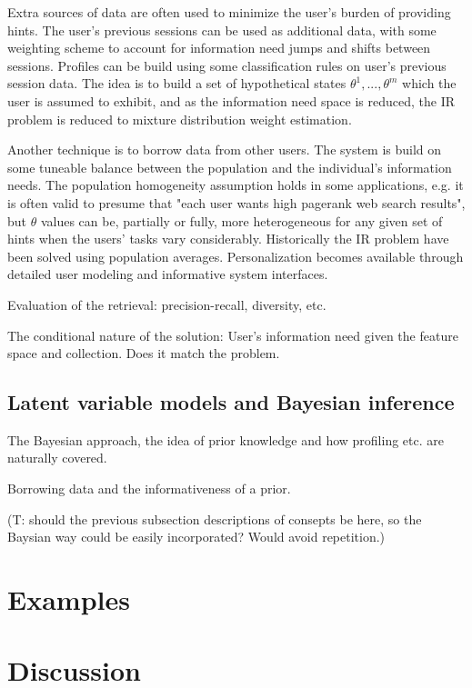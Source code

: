 \documentclass[10pt]{tufte-handout}
\begin{document}
Extra sources of data are often used to minimize the user's burden of providing hints. The user's previous sessions can be used as additional data, with some weighting scheme to account for information need jumps and shifts between sessions. Profiles can be build using some classification rules on user's previous session data. The idea is to build a set of hypothetical states $\theta^1, ..., \theta^m$ which the user is assumed to exhibit, and as the information need space is reduced, the IR problem is reduced to mixture distribution weight estimation.

Another technique is to borrow data from other users. The system is build on some tuneable balance between the population and the individual's information needs. The population homogeneity assumption holds in some applications, e.g. it is often valid to presume that "each user wants high pagerank web search results", but $\theta$ values can be, partially or fully, more heterogeneous for any given set of hints when the users' tasks vary considerably. Historically the IR problem have been solved using population averages. Personalization becomes available through detailed user modeling and informative system interfaces.

Evaluation of the retrieval: precision-recall, diversity, etc.

The conditional nature of the solution: User's information need given the feature space and collection. Does it match the problem.

\subsection{Latent variable models and Bayesian inference}

The Bayesian approach, the idea of prior knowledge and how profiling etc. are naturally covered.

Borrowing data and the informativeness of a prior.

(T: should the previous subsection descriptions of consepts be here, so the Baysian way could be easily incorporated? Would avoid repetition.)


\section{Examples}

\section{Discussion}
\end{document}
